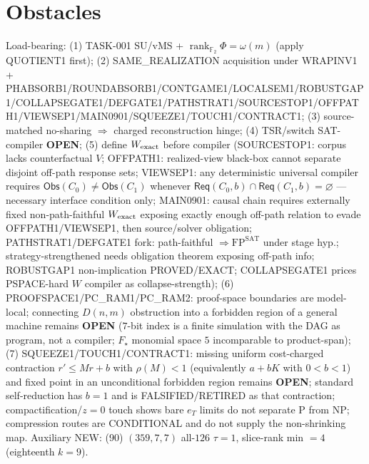 \documentclass[11pt]{article}
\begin{document}
\section*{Obstacles}
Load-bearing: (1) TASK-001 SU/vMS + $\operatorname{rank}_{\mathbb F_2}\Phi=\omega(m)$ (apply QUOTIENT1 first);
(2) SAME\_REALIZATION acquisition under WRAPINV1 + PHABSORB1/ROUNDABSORB1/CONTGAME1/LOCALSEM1/ROBUSTGAP1/COLLAPSEGATE1/DEFGATE1/PATHSTRAT1/SOURCESTOP1/OFFPATH1/VIEWSEP1/MAIN0901/SQUEEZE1/TOUCH1/CONTRACT1;
(3) source-matched no-sharing $\Rightarrow$ charged reconstruction hinge;
(4) TSR/switch SAT-compiler \textbf{OPEN};
(5) define $W_{\rm exact}$ before compiler (SOURCESTOP1: corpus lacks counterfactual $V$;
OFFPATH1: realized-view black-box cannot separate disjoint off-path response sets;
VIEWSEP1: any deterministic universal compiler requires $\mathsf{Obs}(C_0)\ne\mathsf{Obs}(C_1)$
whenever $\mathsf{Req}(C_0,b)\cap\mathsf{Req}(C_1,b)=\varnothing$ --- necessary interface condition only;
MAIN0901: causal chain requires externally fixed non-path-faithful $W_{\rm exact}$ exposing
exactly enough off-path relation to evade OFFPATH1/VIEWSEP1, then source/solver obligation;
PATHSTRAT1/DEFGATE1 fork: path-faithful $\Rightarrow\mathrm{FP}^{\mathrm{SAT}}$ under stage hyp.;
strategy-strengthened needs obligation theorem exposing off-path info;
ROBUSTGAP1 non-implication PROVED/EXACT; COLLAPSEGATE1 prices PSPACE-hard $W$ compiler as collapse-strength);
(6) PROOFSPACE1/PC\_RAM1/PC\_RAM2: proof-space boundaries are model-local; connecting $D(n,m)$ obstruction into a
forbidden region of a general machine remains \textbf{OPEN} ($7$-bit index is a finite simulation with the DAG as program, not a compiler; $F_\star$ monomial space $5$ incomparable to product-span);
(7) SQUEEZE1/TOUCH1/CONTRACT1: missing uniform cost-charged contraction $r'\le Mr+b$ with $\rho(M){<}1$ (equivalently $a+bK$ with $0{<}b{<}1$) and fixed point in an unconditional forbidden region remains \textbf{OPEN};
standard self-reduction has $b{=}1$ and is FALSIFIED/RETIRED as that contraction; compactification/$z{=}0$ touch shows bare $e_T$ limits do not separate P from NP;
compression routes are CONDITIONAL and do not supply the non-shrinking map.
Auxiliary NEW: (90) $(359,7,7)$ all-$126$ $\tau{=}1$, slice-rank min $=4$ (eighteenth $k{=}9$).
\end{document}
